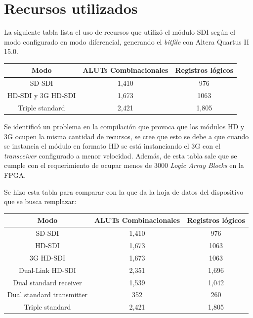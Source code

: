 \section{Recursos utilizados}

  La siguiente tabla lista el uso de recursos que utilizó el módulo SDI según el modo
  configurado en modo diferencial, generando el \textit{bitfile} con Altera Quartus II 15.0.

  \begin{center}
    \begin{tabular}{|c|c|c|}
      \hline
      Modo & ALUTs Combinacionales & Registros lógicos \\
      \hline
      SD-SDI & 1,410 & 976 \\
      \hline
      HD-SDI y 3G HD-SDI & 1,673 & 1063 \\
      \hline
      Triple standard & 2,421 & 1,805 \\
      \hline
    \end{tabular}
  \end{center}

  Se identificó un problema en la compilación que provoca que los módulos HD y 3G ocupen
  la misma cantidad de recursos, se cree que esto se debe a que cuando se instancia el
  módulo en formato HD se está instanciando el 3G con el \textit{transceiver}
  configurado a menor velocidad. Además, de esta tabla sale que se cumple con el
  requerimiento de ocupar menos de 3000 \textit{Logic Array Blocks} en la FPGA\@.

  Se hizo esta tabla para comparar con la que da la hoja de datos del
  dispositivo que se busca remplazar:

  \begin{center}
    \begin{tabular}{|c|c|c|}
      \hline
      Modo & ALUTs Combinacionales & Registros lógicos \\
      \hline
      SD-SDI & 1,410 & 976 \\
      \hline
      HD-SDI & 1,673 & 1063 \\
      \hline
      3G HD-SDI & 1,673 & 1063 \\
      \hline
      Dual-Link HD-SDI & 2,351 & 1,696 \\
      \hline
      Dual standard receiver & 1,539 & 1,042 \\
      \hline
      Dual standard transmitter & 352 & 260 \\
      \hline
      Triple standard & 2,421 & 1,805 \\
      \hline
    \end{tabular}
  \end{center}

